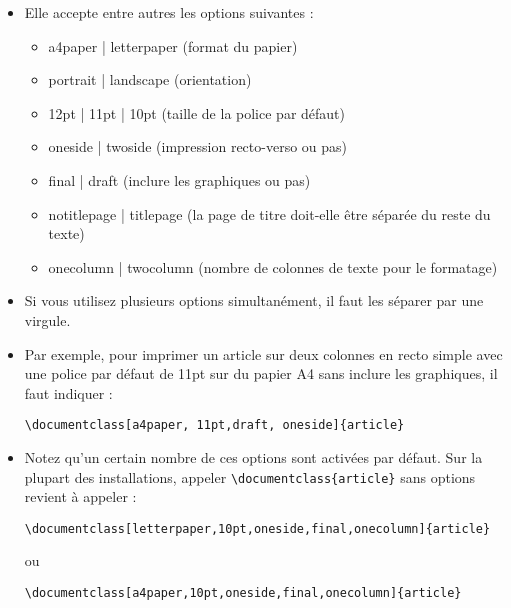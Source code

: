 \begin{itemize}
\item Elle accepte entre autres les options suivantes :
  \begin{itemize}
  \item a4paper | letterpaper \hfill (format du papier)
  \item portrait | landscape \hfill (orientation)
  \item 12pt | 11pt | 10pt \hfill (taille de la police par défaut)
  \item oneside | twoside \hfill (impression recto-verso ou pas)
  \item final | draft \hfill (inclure les graphiques ou pas)
  \item notitlepage | titlepage \hfill (la page de titre doit-elle
    être séparée du reste du texte)
  \item onecolumn | twocolumn \hfill (nombre de colonnes de texte pour
    le formatage)
  \end{itemize}
\item Si vous utilisez plusieurs options simultanément, il faut les
  séparer par une virgule.
\item Par exemple, pour imprimer un article sur deux colonnes en recto
  simple avec une police par défaut de 11pt sur du papier A4 sans
  inclure les graphiques, il faut indiquer :

  \verb=\documentclass[a4paper, 11pt,draft, oneside]{article}=
  
\item Notez qu'un certain nombre de ces options sont activées par
  défaut. Sur la plupart des installations, appeler
  \verb=\documentclass{article}= sans options revient à appeler :

  \verb=\documentclass[letterpaper,10pt,oneside,final,onecolumn]{article}=

  ou

  \verb=\documentclass[a4paper,10pt,oneside,final,onecolumn]{article}=

\end{itemize}



